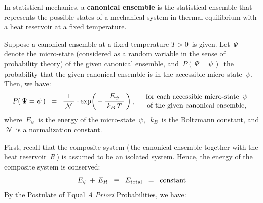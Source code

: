 \vskip 0.5cm
\begin{definition}
\mbox{}
\vskip 0.1cm
\noindent
In statistical mechanics, a \textbf{canonical ensemble} is the statistical ensemble
that represents the possible states of a mechanical system
in thermal equilibrium with a heat reservoir at a fixed temperature.
\end{definition}

\vskip 0.5cm
\begin{proposition}
\mbox{}
\vskip 0.1cm
\noindent
Suppose a canonical ensemble at a fixed temperature $T > 0$\, is given.
Let \,$\Psi$\, denote the micro-state
(considered as a random variable in the sense of probability theory)
of the given canonical ensemble, and
\,$P(\,\Psi = \psi\,)$\,
the probability that the given canonical ensemble
is in the accessible micro-state \,$\psi$.\,
Then, we have:
\begin{equation*}
P(\,\Psi = \psi\,)
\;\; = \;\;
    \dfrac{
        1
        }{
        {\color{white}.}
        \mathcal{N}
        {\color{white}.}
        }
    \cdot
    \exp\!\left(\,
        -\,
        \dfrac{
            E_{\psi}
            }{
            {\color{white}.}
            k_{B}\,T
            {\color{white}.}
            }
        \,\right),
\quad
\begin{array}{c}
\textnormal{for each accessible micro-state \,$\psi$}
\\
\textnormal{of the given canonical ensemble},
\end{array}
\end{equation*}
where
\,$E_{\psi}$\, is the energy of the micro-state \,$\psi$,\,
\,$k_{B}$\, is the Boltzmann constant, and
\,$\mathcal{N}$\, is a normalization constant.
\end{proposition}
\proof
First, recall that the {\color{red}composite} system
(\,the canonical ensemble together with the heat reservoir \,$R$\,)
is assumed to be an {\color{red}isolated} system.
Hence, the energy of the composite system is conserved:
\begin{equation*}
E_{\psi} \,+\, E_{R}
\;\; \equiv \;\;
    E_{\textnormal{total}}
\;\; = \;\;
    \textnormal{constant}
\end{equation*}
By the {\color{red}Postulate of Equal \textit{A Priori} Probabilities}, we have:
